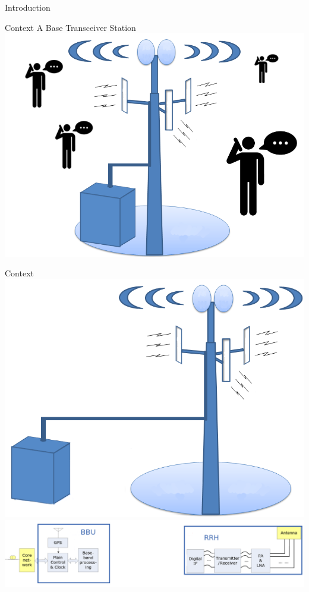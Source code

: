\documentclass[10 pt]{beamer}
\begin{document}
\begin{section}{Introduction}

\begin{frame}{Context}
  \centering
    A Base Transceiver Station
  \includegraphics[scale=0.3]{btsppl.png}

\end{frame}


\begin{frame}{Context}
  \centering
  \includegraphics[scale=0.2]{cloudbts.png}\\
  \includegraphics[scale=0.175]{BBURRH.png}
\end{frame}




\end{section}
\end{document}
